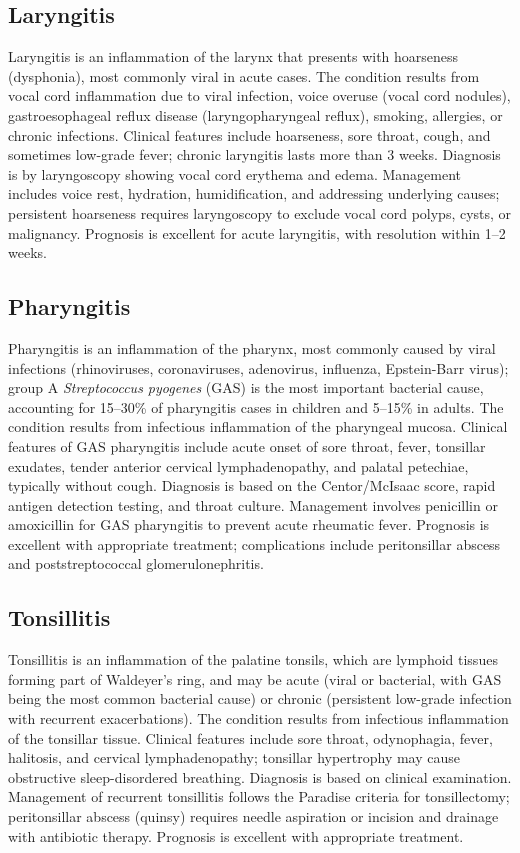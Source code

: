 \subsection{Laryngitis}
\label{sec:Laryngitis}
Laryngitis is an inflammation of the larynx that presents with hoarseness (dysphonia), most commonly viral in acute cases. The condition results from vocal cord inflammation due to viral infection, voice overuse (vocal cord nodules), gastroesophageal reflux disease (laryngopharyngeal reflux), smoking, allergies, or chronic infections. Clinical features include hoarseness, sore throat, cough, and sometimes low-grade fever; chronic laryngitis lasts more than 3 weeks. Diagnosis is by laryngoscopy showing vocal cord erythema and edema. Management includes voice rest, hydration, humidification, and addressing underlying causes; persistent hoarseness requires laryngoscopy to exclude vocal cord polyps, cysts, or malignancy. Prognosis is excellent for acute laryngitis, with resolution within 1--2 weeks.

\subsection{Pharyngitis}
\label{sec:Pharyngitis}
Pharyngitis is an inflammation of the pharynx, most commonly caused by viral infections (rhinoviruses, coronaviruses, adenovirus, influenza, Epstein-Barr virus); group A \textit{Streptococcus pyogenes} (GAS) is the most important bacterial cause, accounting for 15--30\% of pharyngitis cases in children and 5--15\% in adults. The condition results from infectious inflammation of the pharyngeal mucosa. Clinical features of GAS pharyngitis include acute onset of sore throat, fever, tonsillar exudates, tender anterior cervical lymphadenopathy, and palatal petechiae, typically without cough. Diagnosis is based on the Centor/McIsaac score, rapid antigen detection testing, and throat culture. Management involves penicillin or amoxicillin for GAS pharyngitis to prevent acute rheumatic fever. Prognosis is excellent with appropriate treatment; complications include peritonsillar abscess and poststreptococcal glomerulonephritis.

\subsection{Tonsillitis}
\label{sec:Tonsillitis}
Tonsillitis is an inflammation of the palatine tonsils, which are lymphoid tissues forming part of Waldeyer's ring, and may be acute (viral or bacterial, with GAS being the most common bacterial cause) or chronic (persistent low-grade infection with recurrent exacerbations). The condition results from infectious inflammation of the tonsillar tissue. Clinical features include sore throat, odynophagia, fever, halitosis, and cervical lymphadenopathy; tonsillar hypertrophy may cause obstructive sleep-disordered breathing. Diagnosis is based on clinical examination. Management of recurrent tonsillitis follows the Paradise criteria for tonsillectomy; peritonsillar abscess (quinsy) requires needle aspiration or incision and drainage with antibiotic therapy. Prognosis is excellent with appropriate treatment.

